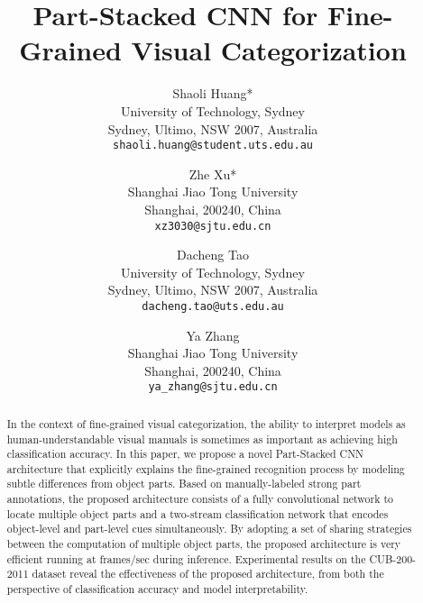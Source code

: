 \documentclass[10pt,twocolumn,letterpaper]{article}
\begin{document}
\title{Part-Stacked CNN for Fine-Grained Visual Categorization}


\author{Shaoli Huang*\\
University of Technology, Sydney\\
Sydney, Ultimo, NSW 2007, Australia\\
{\tt\small shaoli.huang@student.uts.edu.au}
\and
Zhe Xu*\\
Shanghai Jiao Tong University\\
Shanghai, 200240, China\\
{\tt\small xz3030@sjtu.edu.cn}
\and
Dacheng Tao\\
University of Technology, Sydney\\
Sydney, Ultimo, NSW 2007, Australia\\
{\tt\small dacheng.tao@uts.edu.au}
\and
Ya Zhang\\
Shanghai Jiao Tong University\\
Shanghai, 200240, China\\
{\tt\small ya\_zhang@sjtu.edu.cn}
}


\iffalse
\author[1]{Shaoli Huang}
\author[1,2]{Zhe Xu}
\author[1]{Dacheng Tao}
\author[2]{Ya Zhang\vspace{-4mm}}
\affil[1]{\small{Centre for Quantum Computation and Intelligent Systems, Faculty of Engineering and Information Technology,
University of Technology, Sydney, Ultimo, NSW 2007, Australia}
\affil[2]
{\small{Cooperative Medianet Innovation Center and the Shanghai Key Laboratory of Multimedia Processing and Transmissions, Shanghai Jiao Tong University, Shanghai, 200240, China
}}
\authorcr
\href{shaoli.huang@student.uts.edu.au}{\tt\small\{shaoli.huang@student.,dacheng.tao@\}uts.edu.au, }{\{xz3030,ya\_zhang\}@sjtu.edu.cn}\vspace{-4mm}
}
\fi


\maketitle


\begin{abstract}


   In the context of fine-grained visual categorization, the ability to interpret models as human-understandable visual manuals is sometimes as important as achieving high classification accuracy. In this paper, we propose a novel Part-Stacked CNN architecture that explicitly explains the fine-grained recognition process by modeling subtle differences from object parts. Based on manually-labeled strong part annotations, the proposed architecture consists of a fully convolutional network to locate multiple object parts and a two-stream classification network that encodes object-level and part-level cues simultaneously. By adopting a set of sharing strategies between the computation of multiple object parts, the proposed architecture is very efficient running at  frames/sec during inference. Experimental results on the CUB-200-2011 dataset reveal the effectiveness of the proposed architecture, from both the perspective of classification accuracy and model interpretability.
\end{abstract}
\end{document}
